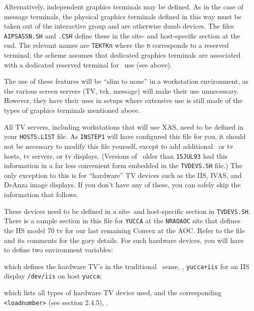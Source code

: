 Alternatively, independent graphics terminals may be defined.  As in
the case of message terminals, the physical graphics terminals defined
in this way must be taken out of the interactive group and are
otherwise dumb devices.  The files {\tt AIPSASSN.SH} and {\tt .CSH}
define these in the site- and host-specific section at the end.
The relevant names are {\tt TEKTKn} where the {\tt n} corresponds to a
reserved terminal; the scheme assumes that dedicated graphics
terminals are associated with a dedicated reserved terminal for
\AIPS\ use (see above).

The use of these features will be ``slim to none'' in a workstation
environment, as the various screen servers (TV, tek, message) will make
their use unnecessary.  However, they have their uses in setups where
extensive use is still made of the types of graphics terminals mentioned
above.
\medskip


All TV servers, including workstations that will use XAS, need to be
defined in your {\tt HOSTS.LIST} file.  As {\tt INSTEP1} will have
configured this file for you, it should not be necessary to modify this
file yourself, except to add additional \aips\ or tv hosts, tv servers,
or tv displays.
(Versions of \AIPS\ older than {\tt 15JUL93} had this information in a
far less convenient form embedded in the {\tt TVDEVS.SH} file.)
The only exception to this is for ``hardware'' TV devices such as the
IIS, IVAS, and DeAnza image displays.  If you don't have any of these,
you can safely skip the information that follows.

These devices need to be defined in a site- and host-specific section in
{\tt TVDEVS.SH}.  There is a sample section in this file for {\tt YUCCA}
at the {\tt NRAOAOC} site that defines the IIS model 70 tv for our last
remaining Convex at the AOC.  Refer to the file and its comments for the
gory details.
For such hardware devices, you will have to define two environment
variables: \medskip

\item{} which defines the hardware TV's in the
                  traditional \AIPS\ sense, \eg, {\tt yucca+iis} for an
                  IIS display {\tt /dev/iis} on host {\tt yucca};
\item{} which lists all types of hardware TV
                  device used, and the corresponding {\tt <loadnumber>}
                  (see section 2.4.5), .
\medskip

